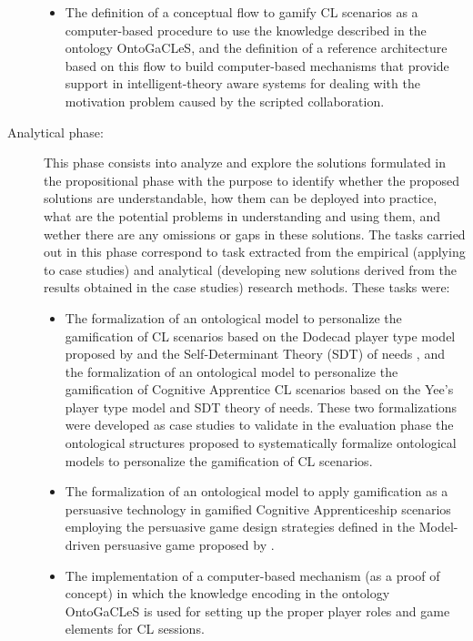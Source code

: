\begin{description}
\begin{itemize}
\item
The definition of a conceptual flow to gamify CL scenarios as a computer-based procedure to use the knowledge described in the ontology OntoGaCLeS, and the definition of a reference architecture based on this flow to build computer-based mechanisms that provide support in intelligent-theory aware systems for dealing with the motivation problem caused by the scripted collaboration.
\end{itemize}

\item[Analytical phase:]
This phase consists into analyze and explore the solutions formulated in the propositional phase with the purpose to identify whether the proposed solutions are understandable, how them can be deployed into practice, what are the potential problems in understanding and using them, and wether there are any omissions or gaps in these solutions. The tasks carried out in this phase correspond to task extracted from the empirical (applying to case studies) and analytical (developing new solutions derived from the results obtained in the case studies) research methods. These tasks were:

\begin{itemize}
\item
The formalization of an ontological model to personalize the gamification of CL scenarios based on the Dodecad player type model proposed by  and the Self-Determinant Theory (SDT) of needs \cite{DeciRyan2010}, and the formalization of an ontological model to personalize the gamification of Cognitive Apprentice CL scenarios based on the Yee's player type model and SDT theory of needs. These two formalizations were developed as case studies to validate in the evaluation phase the ontological structures proposed to systematically formalize ontological models to personalize the gamification of CL scenarios.

\item
The formalization of an ontological model to apply gamification as a persuasive technology in gamified Cognitive Apprenticeship scenarios employing the persuasive game design strategies defined in the Model-driven persuasive game proposed by .

\item
The implementation of a computer-based mechanism (as a proof of concept) in which the knowledge encoding in the ontology OntoGaCLeS is used for setting up the proper player roles and game elements for CL sessions.


\end{itemize}
\end{description}
